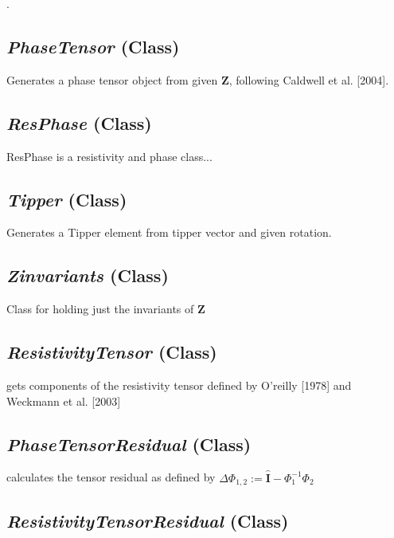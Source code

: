 .


\subsection{\textit{PhaseTensor} (Class)}
\label{ssec:core.z.PhaseTensor}

    Generates a  phase tensor object from given $\mathbf{Z}$, following 
    Caldwell et al. [2004].

\subsection{\textit{ResPhase} (Class)}
\label{ssec:core.z.ResPhase}
ResPhase is a resistivity and phase class...

\subsection{\textit{Tipper} (Class)}
\label{ssec:core.z.Tipper}

Generates a Tipper element from tipper vector and given rotation.

\subsection{\textit{Zinvariants} (Class)}
\label{ssec:core.z.Zinvariants}

Class for holding just the invariants of $\mathbf{Z}$

\subsection{\textit{ResistivityTensor} (Class)}
\label{ssec:core.z.ResistivityTensor}

  gets components of the resistivity tensor defined by 
    O'reilly [1978] and Weckmann et al. [2003]

\subsection{\textit{PhaseTensorResidual} (Class)}
\label{ssec:core.z.PhaseTensorResidual}
  
  calculates the tensor residual as defined by 
$ \Delta \Phi_{1,2} := \hat{\mathbf{I}} - \Phi_1^{-1} \Phi_2$

\subsection{\textit{ResistivityTensorResidual} (Class)}
\label{ssec:core.z.ResistivityTensorResidual}


